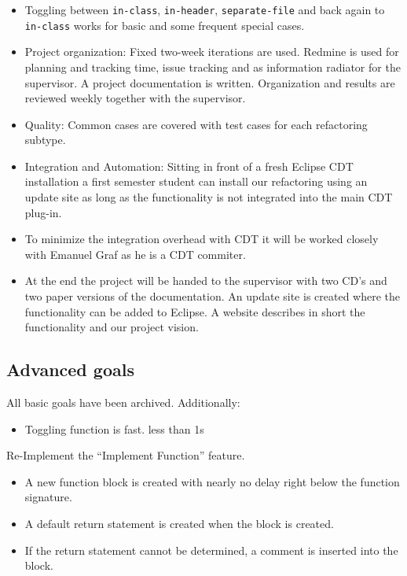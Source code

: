 \documentclass[a4paper,12pt]{scrreprt}
\begin{document}
\begin{itemize}
 \item Toggling between \texttt{in-class}, \texttt{in-header},
\texttt{separate-file} and back again to \texttt{in-class} works for basic and
some frequent special cases.
 \item Project organization: Fixed two-week iterations are used. Redmine is used
for planning and tracking time, issue tracking and as information radiator for
the supervisor. A project documentation is written. Organization and results are
reviewed weekly together with the supervisor.
 \item Quality: Common cases are covered with test cases for each
refactoring subtype.
 \item Integration and Automation: Sitting in front of a fresh Eclipse CDT
installation a first semester student can install our refactoring using an
update site as long as the functionality is not integrated into the main CDT
plug-in.
 \item To minimize the integration overhead with CDT it will be worked closely
with Emanuel Graf as he is a CDT commiter.
 \item At the end the project will be handed to the supervisor with two CD's and
two paper versions of the documentation. An update site is created where the
functionality can be added to Eclipse. A website describes in short the
functionality and our project vision.
\end{itemize}

\subsection*{Advanced goals}
All basic goals have been archived. Additionally:\newline
\begin{itemize}
 \item Toggling function is fast. less than 1s
\end{itemize}

Re-Implement the ``Implement Function'' feature.
\begin{itemize}
 \item A new function block is created with nearly no delay right below the
function signature.
 \item A default return statement is created when the block is created.
 \item If the return statement cannot be determined, a comment is inserted into the block.
\end{itemize}
\end{document}

